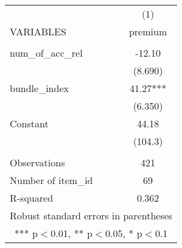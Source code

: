 \documentclass[]{article}
\begin{document}
\begin{tabular}{lc} \hline
 & (1) \\
VARIABLES & premium \\ \hline
 &  \\
num\_of\_acc\_rel & -12.10 \\
 & (8.690) \\
bundle\_index & 41.27*** \\
 & (6.350) \\
Constant & 44.18 \\
 & (104.3) \\
 &  \\
Observations & 421 \\
Number of item\_id & 69 \\
 R-squared & 0.362 \\ \hline
\multicolumn{2}{c}{ Robust standard errors in parentheses} \\
\multicolumn{2}{c}{ *** p$<$0.01, ** p$<$0.05, * p$<$0.1} \\
\end{tabular}
\end{document}
